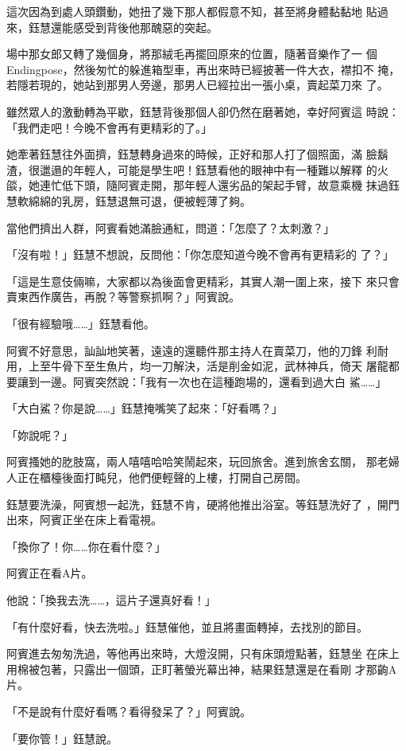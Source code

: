 這次因為到處人頭鑽動，她扭了幾下那人都假意不知，甚至將身體黏黏地
貼過來，鈺慧還能感受到背後他那醜惡的突起。

場中那女郎又轉了幾個身，將那絨毛再擺回原來的位置，隨著音樂作了一
個Endingpose，然後匆忙的躲進箱型車，再出來時已經披著一件大衣，襟扣不
掩，若隱若現的，她站到那男人旁邊，那男人已經拉出一張小桌，賣起菜刀來
了。

雖然眾人的激動轉為平歇，鈺慧背後那個人卻仍然在磨著她，幸好阿賓這
時說：「我們走吧！今晚不會再有更精彩的了。」

她牽著鈺慧往外面擠，鈺慧轉身過來的時候，正好和那人打了個照面，滿
臉鬍渣，很邋遢的年輕人，可能是學生吧！鈺慧看他的眼神中有一種難以解釋
的火燄，她連忙低下頭，隨阿賓走開，那年輕人還劣品的架起手臂，故意乘機
抹過鈺慧軟綿綿的乳房，鈺慧退無可退，便被輕薄了夠。

當他們擠出人群，阿賓看她滿臉通紅，問道：「怎麼了？太刺激？」

「沒有啦！」鈺慧不想說，反問他：「你怎麼知道今晚不會再有更精彩的
了？」

「這是生意伎倆嘛，大家都以為後面會更精彩，其實人潮一圍上來，接下
來只會賣東西作廣告，再脫？等警察抓啊？」阿賓說。

「很有經驗哦……」鈺慧看他。

阿賓不好意思，訕訕地笑著，遠遠的還聽件那主持人在賣菜刀，他的刀鋒
利耐用，上至牛骨下至生魚片，均一刀解決，活是削金如泥，武林神兵，倚天
屠龍都要讓到一邊。阿賓突然說：「我有一次也在這種跑場的，還看到過大白
鯊……」

「大白鯊？你是說……」鈺慧掩嘴笑了起來：「好看嗎？」

「妳說呢？」

阿賓搔她的肐肢窩，兩人嘻嘻哈哈笑鬧起來，玩回旅舍。進到旅舍玄關，
那老婦人正在櫃檯後面打盹兒，他們便輕聲的上樓，打開自己房間。

鈺慧要洗澡，阿賓想一起洗，鈺慧不肯，硬將他推出浴室。等鈺慧洗好了
，開門出來，阿賓正坐在床上看電視。

「換你了！你……你在看什麼？」

阿賓正在看A片。

他說：「換我去洗……，這片子還真好看！」

「有什麼好看，快去洗啦。」鈺慧催他，並且將畫面轉掉，去找別的節目。

阿賓進去匆匆洗過，等他再出來時，大燈沒開，只有床頭燈點著，鈺慧坐
在床上用棉被包著，只露出一個頭，正盯著螢光幕出神，結果鈺慧還是在看剛
才那齣A片。

「不是說有什麼好看嗎？看得發呆了？」阿賓說。

「要你管！」鈺慧說。


